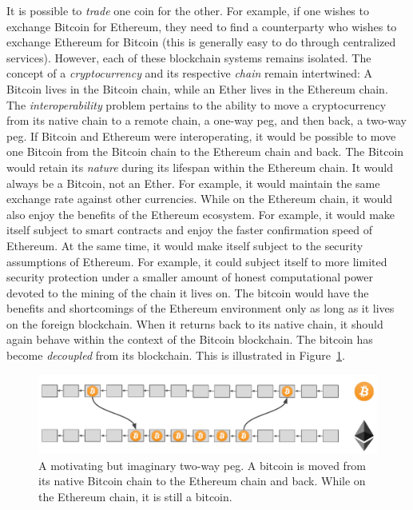 It is possible to \emph{trade} one coin for the other. For example, if one
wishes to exchange Bitcoin for Ethereum, they need to find a counterparty who
wishes to exchange Ethereum for Bitcoin (this is generally easy to do through
centralized services). However, each of these blockchain systems remains
isolated. The concept of a \emph{cryptocurrency} and its respective \emph{chain}
remain intertwined: A Bitcoin lives in the Bitcoin chain, while an Ether lives
in the Ethereum chain. The \emph{interoperability} problem pertains to the
ability to move a cryptocurrency from its native chain to a remote chain,
a one-way peg, and then back, a two-way
peg. If Bitcoin and Ethereum were interoperating, it would be
possible to move one Bitcoin from the Bitcoin chain to the Ethereum chain and
back. The Bitcoin would retain its \emph{nature} during its lifespan within the
Ethereum chain. It would always be a Bitcoin, not an Ether. For example, it
would maintain the same exchange rate against other currencies. While on the
Ethereum chain, it would also enjoy the benefits of the Ethereum ecosystem. For
example, it would make itself subject to smart contracts and enjoy the faster
confirmation speed of Ethereum. At the same time, it would make itself subject
to the security assumptions of Ethereum. For example, it could subject itself to
more limited security protection under a smaller amount of honest computational
power devoted to the mining of the chain it lives on. The bitcoin would have the
benefits and shortcomings of the Ethereum environment only as long as it lives
on the foreign blockchain. When it returns back to its native chain, it should
again behave within the context of the Bitcoin blockchain. The bitcoin has
become \emph{decoupled} from its blockchain. This is illustrated in
Figure~\ref{fig.two-way-peg}.

\begin{figure}[tb]%
  \centering
  \includegraphics[width=0.9 \textwidth]{chapters/introduction/figures/two-way-peg.pdf}
  \caption{
    A motivating but imaginary two-way peg. A bitcoin is moved from its native
    Bitcoin chain to the Ethereum chain and back. While on the Ethereum chain,
    it is still a bitcoin.
  }
  \label{fig.two-way-peg}
\end{figure}%

